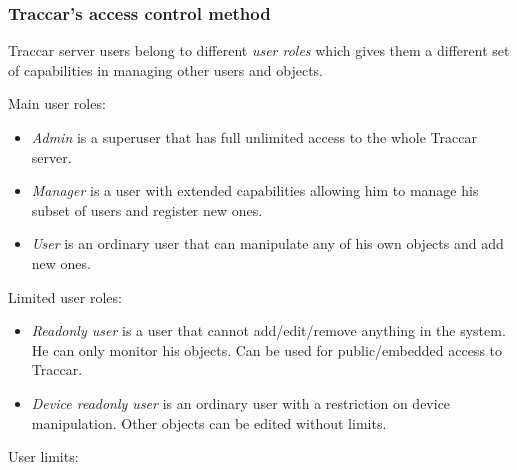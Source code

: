 \documentclass[a4paper]{article}
\begin{document}
\subsubsection*{Traccar's access control method}

Traccar server users belong to different \emph{user roles} which gives them a different set of capabilities in managing other users and 
objects.


    {\raggedright Main user roles:}

\begin{itemize}
    \item \emph{Admin} is a superuser that has full unlimited access to the whole Traccar server.
    \item \emph{Manager} is a user with extended capabilities allowing him to manage his subset of users and register new ones.
    \item \emph{User} is an ordinary user that can manipulate any of his own objects and add new ones.
\end{itemize}

{\raggedright Limited user roles:}

\begin{itemize}
    \item \emph{Readonly user} is a user that cannot add/edit/remove anything in the system. He can only monitor his objects.
          Can be used for public/embedded access to Traccar.
    \item \emph{Device readonly user} is an ordinary user with a restriction on device manipulation. Other objects can be edited
          without limits. 
\end{itemize}

{\raggedright User limits:}
\end{document}
